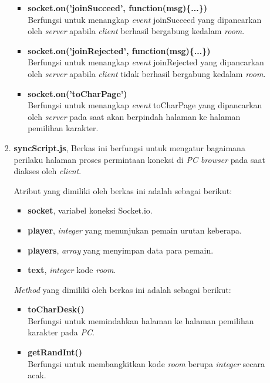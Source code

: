 \begin{enumerate}
\begin{enumerate}
\begin{enumerate}
\begin{itemize}
				\item \textbf{socket.on('joinSucceed', function(msg)\{...\})} \\
				Berfungsi untuk menangkap \textit{event} joinSucceed yang dipancarkan oleh \textit{server} apabila \textit{client} berhasil bergabung kedalam \textit{room}.
				
				\item \textbf{socket.on('joinRejected', function(msg)\{...\})} \\
				Berfungsi untuk menangkap \textit{event} joinRejected yang dipancarkan oleh \textit{server} apabila \textit{client} tidak berhasil bergabung kedalam \textit{room}.
				
				\item \textbf{socket.on('toCharPage')} \\
				Berfungsi untuk menangkap \textit{event} toCharPage yang dipancarkan oleh \textit{server} pada saat akan berpindah halaman ke halaman pemilihan karakter.
			\end{itemize}
			
			\item \textbf{syncScript.js}, Berkas ini berfungsi untuk mengatur bagaimana perilaku halaman proses permintaan koneksi di \textit{PC browser} pada saat diakses oleh \textit{client}.
			
			Atribut yang dimiliki oleh berkas ini adalah sebagai berikut:
			\begin{itemize}
				\item \textbf{socket}, variabel koneksi Socket.io.
				\item \textbf{player}, \textit{integer} yang menunjukan pemain urutan keberapa.
				\item \textbf{players}, \textit{array} yang menyimpan data para pemain.
				\item \textbf{text}, \textit{integer} kode \textit{room}. 
			\end{itemize}
			
			\textit{Method} yang dimiliki oleh berkas ini adalah sebagai berikut:
			\begin{itemize}
				\item \textbf{toCharDesk()} \\
				Berfungsi untuk memindahkan halaman ke halaman pemilihan karakter pada \textit{PC}.
				
				\item \textbf{getRandInt()} \\
				Berfungsi untuk membangkitkan kode \textit{room} berupa \textit{integer} secara acak.
				

\end{itemize}
\end{enumerate}
\end{enumerate}
\end{enumerate}
